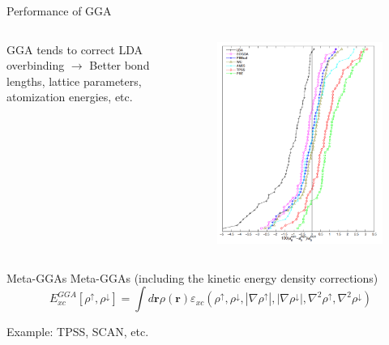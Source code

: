 \documentclass[aspectratio=169]{beamer}
\let \vec \mathbf
\begin{document}
\begin{frame}{Performance of GGA}
\begin{columns}
GGA tends to correct LDA overbinding $\rightarrow$
Better bond lengths, lattice parameters, atomization energies, etc.

\begin{figure}
    \centering
    \includegraphics[width=\linewidth]{lectures/figures/5_bond_lengths.png}
\end{figure}

\end{columns}
\end{frame} 

\begin{frame}{Meta-GGAs}
Meta-GGAs (including the kinetic energy density corrections)
\begin{equation*}
    E_{xc}^{GGA}[\rho^\uparrow, \rho^\downarrow] = \int d \vec{r} \rho(\vec{r})\varepsilon_{xc}(\rho^\uparrow, \rho^\downarrow, |\nabla\rho^\uparrow|, |\nabla\rho^\downarrow|, \nabla^2\rho^\uparrow, \nabla^2\rho^\downarrow)
\end{equation*}

Example: TPSS,\cite{taoClimbingDensityFunctional2003} SCAN,\cite{sunStronglyConstrainedAppropriately2015} etc.

\end{frame} 
\end{document}
